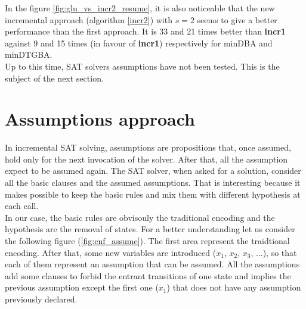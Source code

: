 \noindent In the figure \ref{fig:glu_vs_incr2_resume}, it is also noticeable that the new incremental
approach (algorithm \ref{incr2}) with $s = 2$ seems to give a better performance than the first approach.
It is 33 and 21 times better than \textbf{incr1} against 9 and 15 times (in favour of \textbf{incr1})
respectively for minDBA and minDTGBA.\\

\noindent Up to this time, SAT solvers assumptions have not been tested. This is the subject of the next
section.

\section{Assumptions approach}
In incremental SAT solving, assumptions are propositions that, once assumed, hold only for the next
invocation of the solver. After that, all the assumption expect to be assumed again. The SAT solver, when
asked for a solution, consider all the basic clauses and the assumed assumptions. That is interesting
because it makes possible to keep the basic rules and mix them with different hypothesis at each call.\\

In our case, the basic rules are obvisouly the traditional encoding and the hypothesis are the removal
of states. For a better understanding let us consider the following figure (\ref{fig:cnf_assume}). The
first area represent the traidtional encoding. After that, some new variables are introduced
($x_1$, $x_2$, $x_3$, ...), so that each of them represent an assumption that can be assumed.
All the assumptions add some clauses to forbid the entrant transitions of one state and implies the
previous assumption except the first one ($x_1$) that does not have any assumption previously declared.\\

